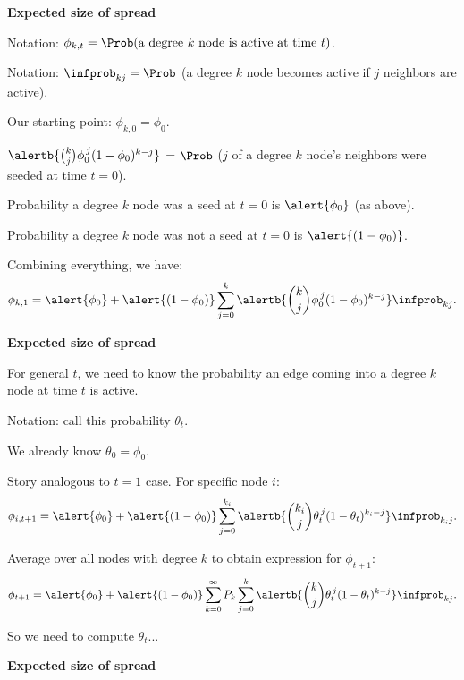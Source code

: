 \begin{frame}[plain]
  \textbf{Expected size of spread}

  
  
    \alert{Notation:}
    $ \phi_{k,t} = 
    \Prob(\mbox{a degree $k$ node is active at time $t$}) $.
  
    \alert{Notation:}
    $\infprob_{k j} = \Prob$ (a degree $k$ node becomes active
    if $j$ neighbors are active).
   
    Our starting point: $ \phi_{k,0} = \phi_0$.
  
    $ 
    \alertb{\binom{k}{j}
      \phi_0^{\, j}
      (1-\phi_0)^{k-j} }
    $ 
    =
    $\Prob$ ($j$ of a degree $k$ node's neighbors were seeded at time $t=0$).
   
    Probability a degree $k$ node was a seed at $t=0$ is $\alert{\phi_0}$ (as above).
   
    Probability a degree $k$ node was not a seed at $t=0$ is $\alert{(1-\phi_0)}$.
   
    Combining everything, we have:
    $$ 
    \phi_{k,1}
    = 
    \alert{\phi_{0}}
    + 
    \alert{(1-\phi_{0})}
    \sum_{j=0}^{k}
    \alertb{\binom{k}{j}
    \phi_0^{\, j}
    (1-\phi_0)^{k-j} }
  \infprob_{k j}.
    $$
  


  \textbf{Expected size of spread}

  
  
    For general $t$, we need to know
    the probability an edge coming into a degree $k$ node
    at time $t$ is active.
  
    \alert{Notation:} call this probability $\theta_t$.
  
    We already know $\theta_0 = \phi_0$.
  
    Story analogous to $t=1$ case.  For specific node $i$:
    $$
    \phi_{i,t+1}
    = 
    \alert{\phi_{0}}
    + 
    \alert{(1-\phi_{0})}
    \sum_{j=0}^{k_i}
    \alertb{\binom{k_i}{j}
    \theta_t^{\, j}
    (1-\theta_t)^{k_i-j}}
    \infprob_{k_i j}.
    $$
  
    Average over all nodes with degree $k$ to obtain expression for $\phi_{t+1}$:
    $$
    \phi_{t+1}
    = 
    \alert{\phi_{0}}
    + 
    \alert{(1-\phi_{0})}
    \sum_{k=0}^{\infty} P_k 
    \sum_{j=0}^{k}
    \alertb{\binom{k}{j}
    \theta_t^{\, j}
    (1-\theta_t)^{k-j}}
    \infprob_{kj}.
    $$
  
    So we need to compute $\theta_t$...  {}
  
  

  \textbf{Expected size of spread}
  

\end{frame}
